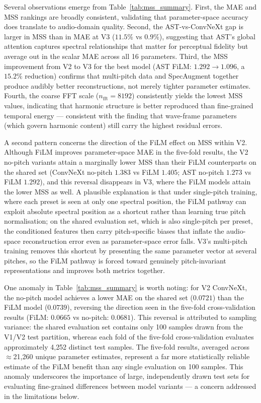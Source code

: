 \noindent
Several observations emerge from Table~\ref{tab:mss_summary}. First, the MAE and MSS rankings are broadly consistent, validating that parameter-space accuracy does translate to audio-domain quality. Second, the AST-vs-ConvNeXt gap is larger in MSS than in MAE at V3 ($11.5\%$ vs $0.9\%$), suggesting that AST's global attention captures spectral relationships that matter for perceptual fidelity but average out in the scalar MAE across all 16 parameters. Third, the MSS improvement from V2 to V3 for the best model (AST FiLM: $1.292 \to 1.096$, a $15.2\%$ reduction) confirms that multi-pitch data and SpecAugment together produce audibly better reconstructions, not merely tighter parameter estimates. Fourth, the coarse FFT scale ($n_\text{fft}=8192$) consistently yields the lowest MSS values, indicating that harmonic structure is better reproduced than fine-grained temporal energy — consistent with the finding that wave-frame parameters (which govern harmonic content) still carry the highest residual errors.

\noindent \newline
A second pattern concerns the direction of the FiLM effect on MSS within V2. Although FiLM improves parameter-space MAE in the five-fold results, the V2 no-pitch variants attain a marginally lower MSS than their FiLM counterparts on the shared set (ConvNeXt no-pitch $1.383$ vs FiLM $1.405$; AST no-pitch $1.273$ vs FiLM $1.292$), and this reversal disappears in V3, where the FiLM models attain the lower MSS as well. A plausible explanation is that under single-pitch training, where each preset is seen at only one spectral position, the FiLM pathway can exploit absolute spectral position as a shortcut rather than learning true pitch normalisation; on the shared evaluation set, which is also single-pitch per preset, the conditioned features then carry pitch-specific biases that inflate the audio-space reconstruction error even as parameter-space error falls. V3's multi-pitch training removes this shortcut by presenting the same parameter vector at several pitches, so the FiLM pathway is forced toward genuinely pitch-invariant representations and improves both metrics together.

\noindent \newline
One anomaly in Table~\ref{tab:mss_summary} is worth noting: for V2 ConvNeXt, the no-pitch model achieves a lower MAE on the shared set ($0.0721$) than the FiLM model ($0.0739$), reversing the direction seen in the five-fold cross-validation results (FiLM: $0.0665$ vs no-pitch: $0.0681$). This reversal is attributed to sampling variance: the shared evaluation set contains only 100 samples drawn from the V1/V2 test partition, whereas each fold of the five-fold cross-validation evaluates approximately 4{,}252 distinct test samples. The five-fold results, averaged across $\approx$21{,}260 unique parameter estimates, represent a far more statistically reliable estimate of the FiLM benefit than any single evaluation on 100 samples. This anomaly underscores the importance of large, independently drawn test sets for evaluating fine-grained differences between model variants — a concern addressed in the limitations below.

